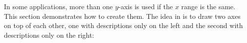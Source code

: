 {%

In some applications, more than one $y$-axis is used if the $x$ range is the
same. This section demonstrates how to create them. The idea in \PGFPlots{} is
to draw two axes on top of each other, one with descriptions only on the left
and the second with descriptions only on the right:
%
\begin{codeexample}[]
\end{codeexample}}
